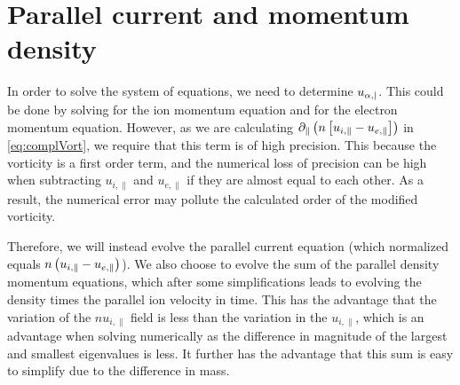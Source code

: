 \section{Parallel current and momentum density}
In order to solve the system of equations, we need to determine $u_{\alpha,|}$.
This could be done by solving for the ion momentum equation and for the electron momentum equation.
However, as we are calculating $\partial_\|\left(n\left[u_{i,\|} - u_{e,\|}\right]\right)$ in \cref{eq:complVort}, we require that this term is of high precision.
This because the vorticity is a first order term, and the numerical loss of precision can be high when subtracting $u_{i,\|}$ and $u_{e,\|}$ if they are almost equal to each other.
As a result, the numerical error may pollute the calculated order of the modified vorticity.

Therefore, we will instead evolve the parallel current equation (which normalized equals $n\left(u_{i,\|} - u_{e,\|}\right)$).
We also choose to evolve the sum of the parallel density momentum equations, which after some simplifications leads to evolving the density times the parallel ion velocity in time.
This has the advantage that the variation of the $nu_{i,\|}$ field is less than the variation in the $u_{i,\|}$, which is an advantage when solving numerically as the difference in magnitude of the largest and smallest eigenvalues is less.
It further has the advantage that this sum is easy to simplify due to the difference in mass.

